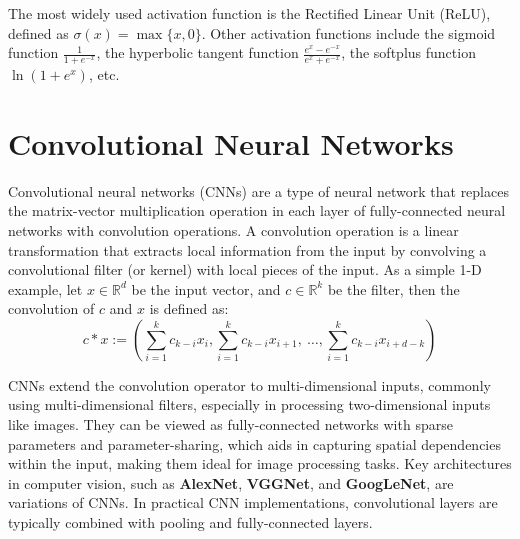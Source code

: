\documentclass[a4paper]{report}
\def\nstyle{int(\lay<\Nnodlen?min(2,\lay):3)} %
\begin{document}
{\begin{center}
\begin{tikzpicture}[x=2.7cm,y=1.6cm]
\end{tikzpicture}
\end{center}
The most widely used activation function is the Rectified Linear Unit (ReLU), defined as \( \sigma(x) = \max\{x, 0\} \). Other activation functions include the sigmoid function \( \frac{1}{1+e^{-x}} \), the hyperbolic tangent function \( \frac{e^x - e^{-x}}{e^x + e^{-x}} \), the softplus function \( \ln(1 + e^x) \), etc.
\newpage
\section{Convolutional Neural Networks}
Convolutional neural networks (CNNs) are a type of neural network that replaces the matrix-vector multiplication operation in each layer of fully-connected neural networks with convolution operations. A convolution operation is a linear transformation that extracts local information from the input by convolving a convolutional filter (or kernel) with local pieces of the input. As a simple 1-D example, let \( x \in \mathbb{R}^d \) be the input vector, and \( c \in \mathbb{R}^k \) be the filter, then the convolution of \( c \) and \( x \) is defined as:
\[
c * x := \left(\sum_{i=1}^{k} c_{k-i} x_{i}, \sum_{i=1}^{k} c_{k-i} x_{i+1},\:\ldots, \sum_{i=1}^{k} c_{k-i} x_{i+d-k}\right)
\]

CNNs extend the convolution operator to multi-dimensional inputs, commonly using multi-dimensional filters, especially in processing two-dimensional inputs like images. They can be viewed as fully-connected networks with sparse parameters and parameter-sharing, which aids in capturing spatial dependencies within the input, making them ideal for image processing tasks. Key architectures in computer vision, such as \textbf{AlexNet}, \textbf{VGGNet}, and \textbf{GoogLeNet}, are variations of CNNs. In practical CNN implementations, convolutional layers are typically combined with pooling and fully-connected layers.
\begin{figure}[H]
\begin{center}
\end{center}
\end{figure}}
\end{document}
